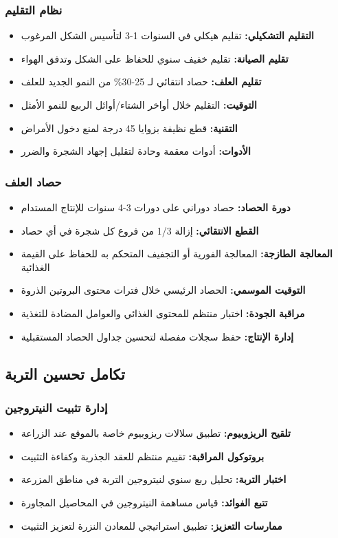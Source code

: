 \subsubsection{نظام التقليم}
\begin{itemize}
    \item \textbf{التقليم التشكيلي:} تقليم هيكلي في السنوات 1-3 لتأسيس الشكل المرغوب
    \item \textbf{تقليم الصيانة:} تقليم خفيف سنوي للحفاظ على الشكل وتدفق الهواء
    \item \textbf{تقليم العلف:} حصاد انتقائي لـ 25-30\% من النمو الجديد للعلف
    \item \textbf{التوقيت:} التقليم خلال أواخر الشتاء/أوائل الربيع للنمو الأمثل
    \item \textbf{التقنية:} قطع نظيفة بزوايا 45 درجة لمنع دخول الأمراض
    \item \textbf{الأدوات:} أدوات معقمة وحادة لتقليل إجهاد الشجرة والضرر
\end{itemize}

\subsubsection{حصاد العلف}
\begin{itemize}
    \item \textbf{دورة الحصاد:} حصاد دوراني على دورات 3-4 سنوات للإنتاج المستدام
    \item \textbf{القطع الانتقائي:} إزالة 1/3 من فروع كل شجرة في أي حصاد
    \item \textbf{المعالجة الطازجة:} المعالجة الفورية أو التجفيف المتحكم به للحفاظ على القيمة الغذائية
    \item \textbf{التوقيت الموسمي:} الحصاد الرئيسي خلال فترات محتوى البروتين الذروة
    \item \textbf{مراقبة الجودة:} اختبار منتظم للمحتوى الغذائي والعوامل المضادة للتغذية
    \item \textbf{إدارة الإنتاج:} حفظ سجلات مفصلة لتحسين جداول الحصاد المستقبلية
\end{itemize}

\subsection{تكامل تحسين التربة}

\subsubsection{إدارة تثبيت النيتروجين}
\begin{itemize}
    \item \textbf{تلقيح الريزوبيوم:} تطبيق سلالات ريزوبيوم خاصة بالموقع عند الزراعة
    \item \textbf{بروتوكول المراقبة:} تقييم منتظم للعقد الجذرية وكفاءة التثبيت
    \item \textbf{اختبار التربة:} تحليل ربع سنوي لنيتروجين التربة في مناطق المزرعة
    \item \textbf{تتبع الفوائد:} قياس مساهمة النيتروجين في المحاصيل المجاورة
    \item \textbf{ممارسات التعزيز:} تطبيق استراتيجي للمعادن النزرة لتعزيز التثبيت
\end{itemize}

